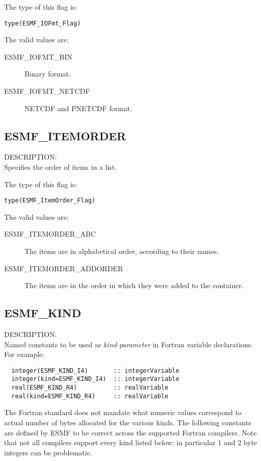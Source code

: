 The type of this flag is:

{\tt type(ESMF\_IOFmt\_Flag)}

The valid values are:
\begin{description}
\item [ESMF\_IOFMT\_BIN]
      Binary format.
\item [ESMF\_IOFMT\_NETCDF]
      NETCDF and PNETCDF format.
\end{description}


\subsection{ESMF\_ITEMORDER}
\label{const:itemorderflag}
{\sf DESCRIPTION:\\}  
Specifies the order of items in a list.

The type of this flag is:

{\tt type(ESMF\_ItemOrder\_Flag)}

The valid values are:
\begin{description}

\item [ESMF\_ITEMORDER\_ABC]
         The items are in alphabetical order, according to their names.
\item [ESMF\_ITEMORDER\_ADDORDER]
         The items are in the order in which they were added to the container.
\end{description}


\subsection{ESMF\_KIND}
\label{const:kind}

{\sf DESCRIPTION:\\}
Named constants to be used as {\em kind-parameter} in Fortran variable
declarations. For example:
\begin{verbatim}
  integer(ESMF_KIND_I4)       :: integerVariable
  integer(kind=ESMF_KIND_I4)  :: integerVariable
  real(ESMF_KIND_R4)          :: realVariable
  real(kind=ESMF_KIND_R4)     :: realVariable
\end{verbatim}
The Fortran standard does not mandate what numeric values correspond to
actual number of bytes allocated for the various kinds. The following constants
are defined by ESMF to be correct across the supported Fortran compilers.
Note that not all compilers support every kind listed below; in particular
1 and 2 byte integers can be problematic.

